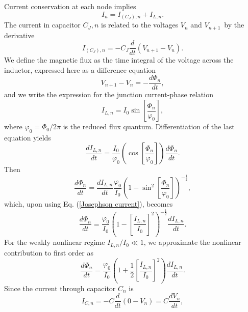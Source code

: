 Current conservation at each node implies
\begin{equation}
I_{n}=I_{ (C_{J}), n}+I_{L,n}.  \label{Current conservation secondary}
\end{equation}
The current in capacitor $C_{J}, n$ is related to the voltages $V_{n}$ and $V_{n+1}$\ by the derivative 
\begin{equation}
I_{ (C_{J}), n}=-C_{J}\frac{d}{dt}\left( V_{n+1}-V_{n}\right).
\label{Current voltage cj}
\end{equation}
We define the magnetic flux as the time integral of the voltage across the inductor, expressed here as a difference equation 
\begin{equation}
V_{n+1}-V_{n}=-\frac{d\Phi _{n}}{dt},
\label{Magnetic flux definition}
\end{equation}
and we write the expression for the junction current-phase relation 
\begin{equation}
I_{L,n}=I_{0}\sin \left[ \frac{\Phi _{n}}{\varphi_{0}}\right] ,
\label{Josephson current}
\end{equation}
where $\varphi_{0} = \Phi _{0}/2\pi$ is the reduced flux quantum.  Differentiation of the last equation yields
\begin{equation}
\frac{dI_{L,n}}{dt}=\frac{I_{0}}{\varphi_{0}}\left( \cos \left[ \frac{\Phi _{n}}{\varphi_{0}}\right] \right) \frac{d\Phi _{n}}{dt}.
\end{equation}
Then
\begin{equation}
\frac{d\Phi _{n}}{dt}=\frac{dI_{L,n}}{dt}\frac{\varphi_{0}}{I_{0}}\left( 1-\sin ^{2}\left[ \frac{\Phi _{n}}{\varphi_{0}}\right] \right)^{-\frac{1}{2}},
\end{equation}
which, upon using Eq. (\ref{Josephson current}), becomes
\begin{equation}
\frac{d\Phi _{n}}{dt}=\frac{\varphi_{0}}{I_{0}}\left( 1-\left[ \frac{I_{L,n}}{I_{0}}\right] ^{2}\right) ^{-\frac{1}{2}}\frac{dI_{L,n}}{dt}.
\label{Nonlinear inductance}
\end{equation}
For the weakly nonlinear regime $I_{L,n}/I_{0} \ll 1$, we approximate the nonlinear contribution to first order as
\begin{equation}
\frac{d\Phi _{n}}{dt}=\frac{\varphi_{0}}{I_{0}}\left( 1+\frac{1}{2} \left[ \frac{I_{L,n}}{I_{0}}\right] ^{2}\right) \frac{dI_{L,n}}{dt}.
\label{Weak nonlinear inductance}
\end{equation}
Since the current through capacitor $C_n$ is
\begin{equation}
I_{C,n}=-C \frac{d}{dt}\left( 0-V_{n}\right)=C\frac{dV_{n}}{dt},
\label{Capacitor current}
\end{equation}
